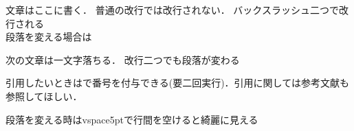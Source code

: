 文章はここに書く．
普通の改行では改行されない．
バックスラッシュ二つで改行される\\
段落を変える場合は\par
次の文章は一文字落ちる．
改行二つでも段落が変わる


引用したいときは\cite{タグをここに書く}で番号を付与できる(要二回実行)．引用に関しては参考文献も参照してほしい．
\par
\vspace{5pt}
段落を変える時はvspace{5pt}で行間を空けると綺麗に見える